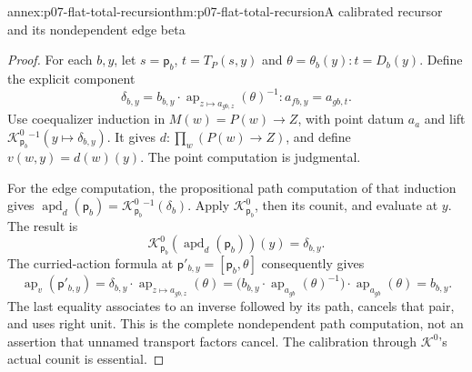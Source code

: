 \begin{annexitem}{annex:p07-flat-total-recursion}{thm:p07-flat-total-recursion}{A calibrated recursor and its nondependent edge beta}
\begin{proof}
For each \(b,y\), let \(s=\mathsf p_b\),
\(t=T_P(s,y)\) and \(\theta=\theta_b(y):t=D_b(y)\).
Define the explicit component
\[
\delta_{b,y}=b_{b,y}\cdot
  \operatorname{ap}_{z\mapsto a_{gb,z}}(\theta)^{-1}
  :a_{fb,y}=a_{gb,t}.
\]
Use coequalizer induction in \(M(w)=P(w)\to Z\), with point datum
\(a_a\) and lift
\(\mathcal K^0_{\mathsf p_b}{}^{-1}
   (y\mapsto\delta_{b,y})\).
It gives \(d:\prod_w(P(w)\to Z)\), and define \(v(w,y)=d(w)(y)\).
The point computation is judgmental.

For the edge computation, the propositional path computation of
that induction gives
\(\operatorname{apd}_d(\mathsf p_b)
 =\mathcal K^0_{\mathsf p_b}{}^{-1}(\delta_b)\).
Apply \(\mathcal K^0_{\mathsf p_b}\), then its counit, and evaluate
at \(y\). The result is
\[
\mathcal K^0_{\mathsf p_b}
   (\operatorname{apd}_d(\mathsf p_b))(y)=\delta_{b,y}.
\]
The curried-action formula at
\(\mathsf p'_{b,y}=[\mathsf p_b,\theta]\) consequently gives
\[
\operatorname{ap}_v(\mathsf p'_{b,y})
 =\delta_{b,y}\cdot
   \operatorname{ap}_{z\mapsto a_{gb,z}}(\theta)
 =\bigl(b_{b,y}\cdot
   \operatorname{ap}_{a_{gb}}(\theta)^{-1}\bigr)
        \cdot\operatorname{ap}_{a_{gb}}(\theta)
 =b_{b,y}.
\]
The last equality associates to an inverse followed by its path,
cancels that pair, and uses right unit. This is the complete
nondependent path computation, not an assertion that unnamed
transport factors cancel. The calibration through
\(\mathcal K^0\)'s actual counit is essential.
\end{proof}
\end{annexitem}

